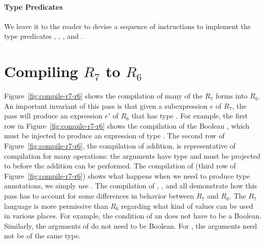 \documentclass[11pt]{book}
\begin{document}
\paragraph{Type Predicates} We leave it to the reader to
devise a sequence of instructions to implement the type predicates
, , , and .

\section{Compiling $R_7$ to $R_6$}
\label{sec:compile-r7}

Figure~\ref{fig:compile-r7-r6} shows the compilation of many of the
$R_7$ forms into $R_6$. An important invariant of this pass is that
given a subexpression $e$ of $R_7$, the pass will produce an
expression $e'$ of $R_6$ that has type . For example, the
first row in Figure~\ref{fig:compile-r7-r6} shows the compilation of
the Boolean , which must be injected to produce an
expression of type .
%
The second row of Figure~\ref{fig:compile-r7-r6}, the compilation of
addition, is representative of compilation for many operations: the
arguments have type  and must be projected to 
before the addition can be performed.
%
The compilation of  (third row of
Figure~\ref{fig:compile-r7-r6}) shows what happens when we need to
produce type annotations, we simply use .
%
The compilation of , , and  all
demonstrate how this pass has to account for some differences in
behavior between $R_7$ and $R_6$. The $R_7$ language is more
permissive than $R_6$ regarding what kind of values can be used in
various places. For example, the condition of an  does not
have to be a Boolean. Similarly, the arguments of  do not
need to be Boolean. For , the arguments need not be of the
same type.
\end{document}
